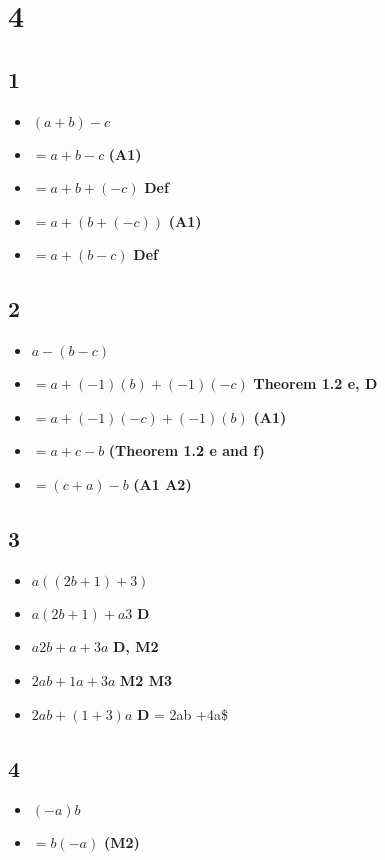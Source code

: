 \documentclass[]{article}
\providecommand{\tightlist}{%
  \setlength{\itemsep}{0pt}\setlength{\parskip}{0pt}}
\begin{document}
\hypertarget{section}{%
\section{4}\label{section}}

\hypertarget{section-1}{%
\subsection{1}\label{section-1}}

\begin{itemize}
\tightlist
\item
  \((a + b) -c\)
\item
  \(= a + b -c\) \textbf{(A1)}
\item
  \(= a + b + (-c)\) \textbf{Def}
\item
  \(= a + (b+(-c))\) \textbf{(A1)}
\item
  \(= a + (b-c)\) \textbf{Def}
\end{itemize}

\hypertarget{section-2}{%
\subsection{2}\label{section-2}}

\begin{itemize}
\tightlist
\item
  \(a - (b-c)\)
\item
  \(= a + (-1)(b) +(-1)(-c)\) \textbf{Theorem 1.2 e, D}
\item
  \(= a + (-1)(-c) + (-1)(b)\) \textbf{(A1)}
\item
  \(= a + c - b\) \textbf{(Theorem 1.2 e and f)}
\item
  \(= (c + a) -b\) \textbf{(A1 A2)}
\end{itemize}

\hypertarget{section-3}{%
\subsection{3}\label{section-3}}

\begin{itemize}
\tightlist
\item
  \(a((2b + 1) + 3)\)
\item
  \(a(2b + 1) + a3\) \textbf{D}
\item
  \(a2b + a + 3a\) \textbf{D, M2}
\item
  \(2ab + 1a + 3a\) \textbf{M2 M3}
\item
  \(2ab + (1+3)a\) \textbf{D} = 2ab +4a\$
\end{itemize}

\hypertarget{section-4}{%
\subsection{4}\label{section-4}}

\begin{itemize}
\tightlist
\item
  \((-a)b\)
\item
  \(=b(-a)\) \textbf{(M2)}
\end{itemize}
\end{document}
